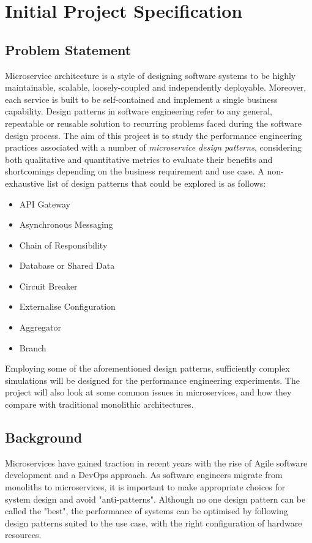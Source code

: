 \section{Initial Project Specification}

\subsection{Problem Statement}
Microservice architecture is a style of designing software systems to be highly maintainable, scalable, loosely-coupled and independently deployable. Moreover, each service is built to be self-contained and implement a single business capability. Design patterns in software engineering refer to any general, repeatable or reusable solution to recurring problems faced during the software design process. The aim of this project is to study the performance engineering practices associated with a number of \textit{microservice design patterns}, considering both qualitative and quantitative metrics to evaluate their benefits and shortcomings depending on the business requirement and use case. A non-exhaustive list of design patterns that could be explored is as follows:

\begin{itemize}
	\item API Gateway
	\item Asynchronous Messaging
	\item Chain of Responsibility
	\item Database or Shared Data
	\item Circuit Breaker
	\item Externalise Configuration
	\item Aggregator
	\item Branch
\end{itemize}

Employing some of the aforementioned design patterns, sufficiently complex simulations will be designed for the performance engineering experiments. The project will also look at some common issues in microservices, and how they compare with traditional monolithic architectures.

\subsection{Background}
Microservices have gained traction in recent years with the rise of Agile software development and a DevOps \cite{awsDevOps} approach. As software engineers migrate from monoliths to microservices, it is important to make appropriate choices for system design and avoid "anti-patterns". Although no one design pattern can be called the "best", the performance of systems can be optimised by following design patterns suited to the use case, with the right configuration of hardware resources.

